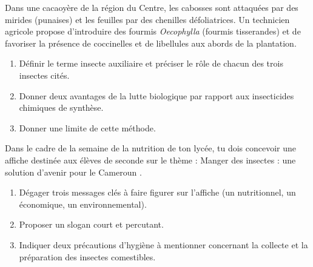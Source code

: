 \documentclass[11pt]{article}
\newcounter{popsec}
\newcounter{popsub}
\newcommand{\courssub}[1]{%
  \stepcounter{popsub}%
  \par\vspace{9pt}\noindent{\popxbold\fontsize{11.5}{13}\selectfont\color{popink}{\color{poporange}\thepopsec.\thepopsub}\hspace{6pt}#1}\par\nopagebreak\vspace{4pt}
}
\begin{document}
\begin{exercice}
Dans une cacaoyère de la région du Centre, les cabosses sont attaquées par des mirides (punaises) et les feuilles par des chenilles défoliatrices. Un technicien agricole propose d'introduire des fourmis \emph{Oecophylla} (fourmis tisserandes) et de favoriser la présence de coccinelles et de libellules aux abords de la plantation.
\begin{enumerate}
\item Définir le terme \og insecte auxiliaire \fg{} et préciser le rôle de chacun des trois insectes cités.
\item Donner deux avantages de la lutte biologique par rapport aux insecticides chimiques de synthèse.
\item Donner une limite de cette méthode.
\end{enumerate}
\end{exercice}

\begin{exercice}
Dans le cadre de la semaine de la nutrition de ton lycée, tu dois concevoir une affiche destinée aux élèves de seconde sur le thème : \og Manger des insectes : une solution d'avenir pour le Cameroun \fg.
\begin{enumerate}
\item Dégager trois messages clés à faire figurer sur l'affiche (un nutritionnel, un économique, un environnemental).
\item Proposer un slogan court et percutant.
\item Indiquer deux précautions d'hygiène à mentionner concernant la collecte et la préparation des insectes comestibles.
\end{enumerate}
\end{exercice}

\courssub{Je me prépare au Bac}
\end{document}

